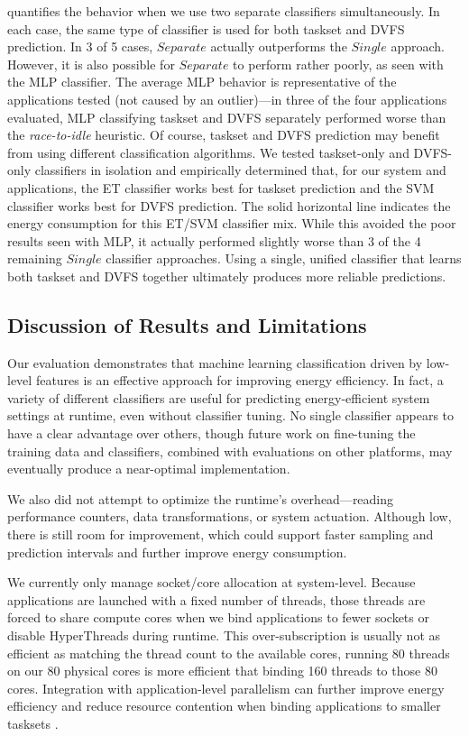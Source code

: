  quantifies the behavior when we use two separate classifiers simultaneously.
In each case, the same type of classifier is used for both taskset and DVFS prediction.
In 3 of 5 cases, $Separate$ actually outperforms the $Single$ approach.
However, it is also possible for $Separate$ to perform rather poorly, as seen with the MLP classifier.
The average MLP behavior is representative of the applications tested (\ie not caused by an outlier)---in three of the four applications evaluated, MLP classifying taskset and DVFS separately performed worse than the \emph{race-to-idle} heuristic.
Of course, taskset and DVFS prediction may benefit from using different classification algorithms.
We tested taskset-only and DVFS-only classifiers in isolation and empirically determined that, for our system and applications, the ET classifier works best for taskset prediction and the SVM classifier works best for DVFS prediction.
The solid horizontal line indicates the energy consumption for this ET/SVM classifier mix.
While this avoided the poor results seen with MLP, it actually performed slightly worse than 3 of the 4 remaining $Single$ classifier approaches.
Using a single, unified classifier that learns both taskset and DVFS together ultimately produces more reliable predictions.


\subsection{Discussion of Results and Limitations}
\label{sec:eval-discuss}

Our evaluation demonstrates that machine learning classification driven by low-level features is an effective approach for improving energy efficiency.
In fact, a variety of different classifiers are useful for predicting energy-efficient system settings at runtime, even without classifier tuning.
No single classifier appears to have a clear advantage over others, though future work on fine-tuning the training data and classifiers, combined with evaluations on other platforms, may eventually produce a near-optimal implementation.

We also did not attempt to optimize the runtime's overhead---reading performance counters, data transformations, or system actuation.
Although low, there is still room for improvement, which could support faster sampling and prediction intervals and further improve energy consumption.

We currently only manage socket/core allocation at system-level.
Because applications are launched with a fixed number of threads, those threads are forced to share compute cores when we bind applications to fewer sockets or disable HyperThreads during runtime.
This over-subscription is usually not as efficient as matching the thread count to the available cores, \eg running 80 threads on our 80 physical cores is more efficient that binding 160 threads to those 80 cores.
Integration with application-level parallelism can further improve energy efficiency and reduce resource contention when binding applications to smaller tasksets \cite{Sridharan2013}.

